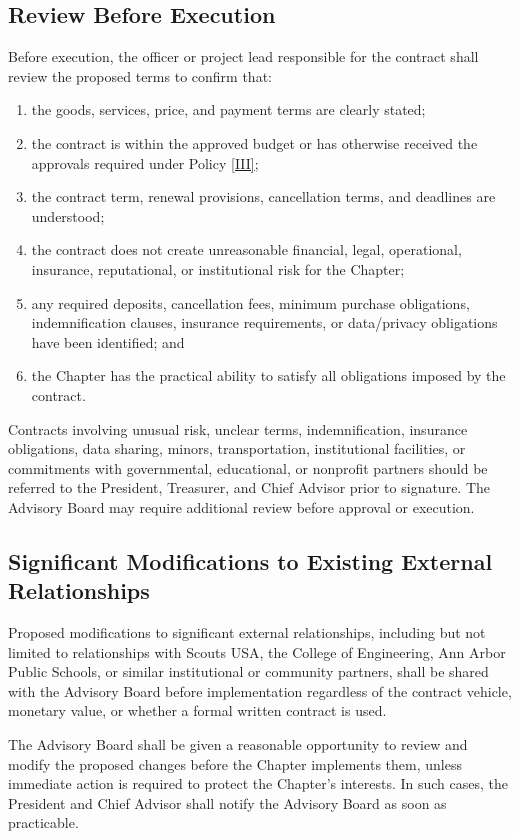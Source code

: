 \subsection{Review Before Execution} \label{XIII.4} 
Before execution, the officer or project lead responsible for the contract shall review the proposed terms to confirm that:
\begin{enumerate}
    \item the goods, services, price, and payment terms are clearly stated;
    \item the contract is within the approved budget or has otherwise received the approvals required under Policy \ref{III};
    \item the contract term, renewal provisions, cancellation terms, and deadlines are understood;
    \item the contract does not create unreasonable financial, legal, operational, insurance, reputational, or institutional risk for the Chapter;
    \item any required deposits, cancellation fees, minimum purchase obligations, indemnification clauses, insurance requirements, or data/privacy obligations have been identified; and
    \item the Chapter has the practical ability to satisfy all obligations imposed by the contract.
\end{enumerate}
Contracts involving unusual risk, unclear terms, indemnification, insurance obligations, data sharing, minors, transportation, institutional facilities, or commitments with governmental, 
educational, or nonprofit partners should be referred to the President, Treasurer, and Chief Advisor prior to signature. 
The Advisory Board may require additional review before approval or execution.

\subsection{Significant Modifications to Existing External Relationships} \label{XIII.5}
Proposed modifications to significant external relationships, including but not limited to relationships with Scouts USA, the College of Engineering, Ann Arbor Public Schools, 
or similar institutional or community partners, shall be shared with the Advisory Board before implementation regardless of the contract vehicle, monetary value, 
or whether a formal written contract is used.

The Advisory Board shall be given a reasonable opportunity to review and modify the proposed changes before the Chapter implements them, unless immediate action is required to 
protect the Chapter’s interests. In such cases, the President and Chief Advisor shall notify the Advisory Board as soon as practicable.

